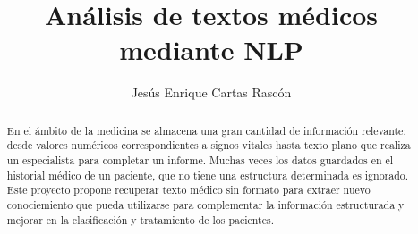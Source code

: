 \documentclass[12pt, a4paper, twoside]{report}
\title{Análisis de textos médicos \\mediante NLP}
\author{Jesús Enrique Cartas Rascón}
\begin{document}


\begin{abstract}
  En el ámbito de la medicina se almacena una gran cantidad de información relevante: desde valores numéricos correspondientes a signos vitales hasta texto plano que realiza un especialista para completar un informe. Muchas veces los datos guardados en el historial médico de un paciente, que no tiene una estructura determinada es ignorado. Este proyecto propone recuperar texto médico sin formato para extraer nuevo conociemiento que pueda utilizarse para complementar la información estructurada y mejorar en la clasificación y tratamiento de los pacientes.
\end{abstract}


\tableofcontents




% 



\end{document}
